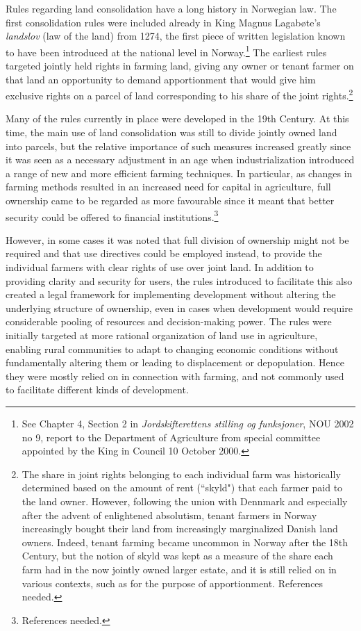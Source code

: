 Rules regarding land consolidation have a long history in Norwegian law. The first consolidation rules were included already in King Magnus Lagabøte's \emph{landslov} (law of the land) from 1274, the first piece of written legislation known to have been introduced at the national level in Norway.\footnote{See Chapter 4, Section 2 in \emph{Jordskifterettens stilling og funksjoner}, NOU 2002 no 9, report to the Department of Agriculture from special committee appointed by the King in Council 10 October 2000.} The earliest rules targeted jointly held rights in farming land, giving any owner or tenant farmer on that land an opportunity to demand apportionment that would give him exclusive rights on a parcel of land corresponding to his share of the joint rights.\footnote{The share in joint rights belonging to each individual farm was historically determined based on the amount of rent (``skyld") that each farmer paid to the land owner. However, following the union with Dennmark and especially after the advent of enlightened absolutism, tenant farmers in Norway increasingly bought their land from increasingly marginalized Danish land owners. Indeed, tenant farming became uncommon in Norway after the 18th Century, but the notion of skyld was kept as a measure of the share each farm had in the now jointly owned larger estate, and it is still relied on in various contexts, such as for the purpose of apportionment. References needed.}

Many of the rules currently in place were developed in the 19th Century. At this time, the main use of land consolidation was still to divide jointly owned land into parcels, but the relative importance of such measures increased greatly since it was seen as a necessary adjustment in an age when industrialization introduced a range of new and more efficient farming techniques. In particular, as changes in farming methods resulted in an increased need for capital in agriculture, full ownership came to be regarded as more favourable since it meant that better security could be offered to financial institutions.\footnote{References needed.} 

However, in some cases it was noted that full division of ownership might not be required and that use directives could be employed instead, to provide the individual farmers with clear rights of use over joint land. In addition to providing clarity and security for users, the rules introduced to facilitate this also created a legal framework for implementing development without altering the underlying structure of ownership, even in cases when development would require considerable pooling of resources and decision-making power. The rules were initially targeted at more rational organization of land use in agriculture, enabling rural communities to adapt to changing economic conditions without fundamentally altering them or leading to displacement or depopulation. Hence they were mostly relied on in connection with farming, and not commonly used to facilitate different kinds of development.

